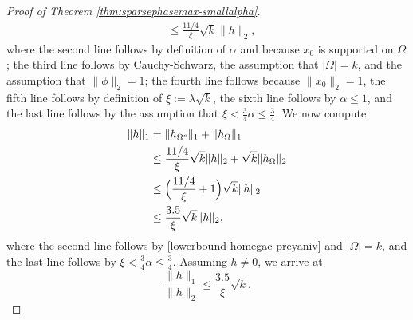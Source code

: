 \documentclass[12pt]{article}
\newcommand{\1}{\mathbf{1}}
\newcommand{\homegac}{h_{\Omega^c}}
\newcommand{\homega}{h_{\Omega}}
\newcommand{\xo}{x_0}
\begin{document}
\begin{proof}[Proof of Theorem \ref{thm:sparsephasemax-smallalpha}]
\begin{align}
&\leq \frac{11/4}{\xi} \sqrt{k} \| h\|_2, \label{lowerbound-homegac-preyaniv}
\end{align}
where the second line follows by definition of $\alpha$ and because $\xo$ is supported on $\Omega$; the third line follows by Cauchy-Schwarz, the assumption that $|\Omega|=k$, and the assumption that $\|\phi\|_2=1$; the fourth line follows because $\|\xo\|_2=1$, the fifth line follows by definition of $\xi := \lambda \sqrt{k}$, the sixth line follows by $\alpha \leq 1$, and the last line follows by the assumption that $\xi < \frac{3}{4} \alpha \leq \frac{3}{4}$. 
We now compute
\begin{align*}
\|h\|_1 &= \| \homegac\|_1 + \|\homega\|_1\\
&\leq \frac{11/4}{\xi} \sqrt{k} \| h\|_2 + \sqrt{k} \| \homega\|_2 \\
&\leq \Bigl( \frac{11/4}{\xi} + 1 \Bigr) \sqrt{k} \|h\|_2\\
&\leq  \frac{3.5}{\xi} \sqrt{k} \|h\|_2,
\end{align*}
where the second line follows by \eqref{lowerbound-homegac-preyaniv} and $|\Omega|=k$,  and the last line follows by $\xi < \frac{3}{4} \alpha \leq \frac{3}{4}$.
Assuming $h \neq 0$, 
we arrive at 
\[
\frac{\|h\|_1}{\|h\|_2} \leq \frac{3.5}{\xi} \sqrt{k}.
\]


\end{proof}
\end{document}

